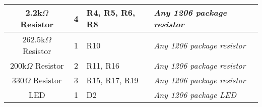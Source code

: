 \begin{tabularx}{\textwidth}{|c|c|X|X|}
 \hline
 2.2k$\Omega$ Resistor           & 4                & R4, R5, R6, R8                         & \textit{Any 1206 package resistor}  \\
 \hline
 262.5k$\Omega$ Resistor         & 1                & R10                                    & \textit{Any 1206 package resistor}  \\
 \hline
 200k$\Omega$ Resistor           & 2                & R11, R16                               & \textit{Any 1206 package resistor}  \\
 \hline
 330$\Omega$ Resistor            & 3                & R15, R17, R19                          & \textit{Any 1206 package resistor}  \\
 \hline
 LED                             & 1                & D2                                     & \textit{Any 1206 package LED}       \\
 \hline
\end{tabularx}